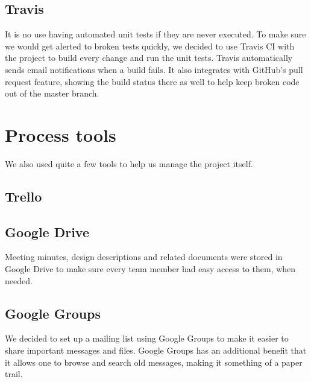 \subsection{Travis}

It is no use having automated unit tests if they are never executed. To make sure we would get alerted to broken tests quickly, we decided to use Travis CI with the project to build every change and run the unit tests. Travis automatically sends email notifications when a build fails. It also integrates with GitHub's pull request feature, showing the build status there as well to help keep broken code out of the master branch.  

\section{Process tools}

We also used quite a few tools to help us manage the project itself.

\subsection{Trello}

\subsection{Google Drive}

Meeting minutes, design descriptions and related documents were stored in Google Drive to make sure every team member had easy access to them, when needed. 

\subsection{Google Groups}

We decided to set up a mailing list using Google Groups to make it easier to share important messages and files. Google Groups has an additional benefit that it allows one to browse and search old messages, making it something of a paper trail. 
